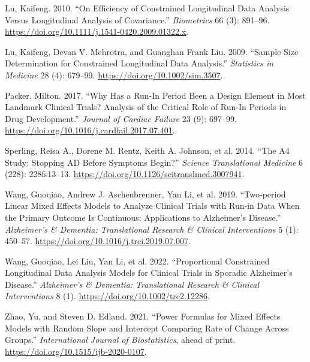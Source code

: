 \documentclass[
  11pt,
]{article}
\newlength{\cslhangindent}
\newenvironment{CSLReferences}[2] %
 {\begin{list}{}{%
  \setlength{\itemindent}{0pt}
  \setlength{\leftmargin}{0pt}
  \setlength{\parsep}{0pt}
  \ifodd #1
   \setlength{\leftmargin}{\cslhangindent}
   \setlength{\itemindent}{-1\cslhangindent}
  \fi
  \setlength{\itemsep}{#2\baselineskip}}}
 {\end{list}}
\begin{document}
\begin{CSLReferences}{1}{1}
Lu, Kaifeng. 2010. {``On Efficiency of Constrained Longitudinal Data
Analysis Versus Longitudinal Analysis of Covariance.''}
\emph{Biometrics} 66 (3): 891--96.
\url{https://doi.org/10.1111/j.1541-0420.2009.01322.x}.

Lu, Kaifeng, Devan V. Mehrotra, and Guanghan Frank Liu. 2009. {``Sample
Size Determination for Constrained Longitudinal Data Analysis.''}
\emph{Statistics in Medicine} 28 (4): 679--99.
\url{https://doi.org/10.1002/sim.3507}.

Packer, Milton. 2017. {``Why {Has} a {Run}-{In} {Period} {Been} a
{Design} {Element} in {Most} {Landmark} {Clinical} {Trials}? {Analysis}
of the {Critical} {Role} of {Run}-{In} {Periods} in {Drug}
{Development}.''} \emph{Journal of Cardiac Failure} 23 (9): 697--99.
\url{https://doi.org/10.1016/j.cardfail.2017.07.401}.

Sperling, Reisa A., Dorene M. Rentz, Keith A. Johnson, et al. 2014.
{``The {A4} {Study}: {Stopping} {AD} {Before} {Symptoms} {Begin}?''}
\emph{Science Translational Medicine} 6 (228): 228fs13--13.
\url{https://doi.org/10.1126/scitranslmed.3007941}.

Wang, Guoqiao, Andrew J. Aschenbrenner, Yan Li, et al. 2019.
{``Two‐period Linear Mixed Effects Models to Analyze Clinical Trials
with Run‐in Data When the Primary Outcome Is Continuous: {Applications}
to {Alzheimer}'s Disease.''} \emph{Alzheimer's \& Dementia:
Translational Research \& Clinical Interventions} 5 (1): 450--57.
\url{https://doi.org/10.1016/j.trci.2019.07.007}.

Wang, Guoqiao, Lei Liu, Yan Li, et al. 2022. {``Proportional Constrained
Longitudinal Data Analysis Models for Clinical Trials in Sporadic
{Alzheimer}'s Disease.''} \emph{Alzheimer's \& Dementia: Translational
Research \& Clinical Interventions} 8 (1).
\url{https://doi.org/10.1002/trc2.12286}.

Zhao, Yu, and Steven D. Edland. 2021. {``Power Formulas for Mixed
Effects Models with Random Slope and Intercept Comparing Rate of Change
Across Groups.''} \emph{International Journal of Biostatistics}, ahead
of print. \url{https://doi.org/10.1515/ijb-2020-0107}.

\end{CSLReferences}
\end{document}
